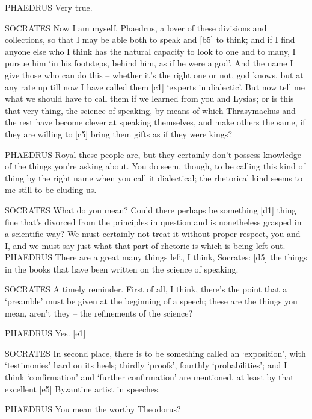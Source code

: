 PHAEDRUS Very true.

SOCRATES Now I am myself, Phaedrus, a lover of these divisions and
collections, so that I may be able both to speak and {[}b5{]} to think;
and if I find anyone else who I think has the natural capacity to look
to one and to many, I
pursue him ‘in his footsteps, behind him, as if he were a
god'. And the name I
give those who can do this -- whether it's the right one or not, god
knows, but at any rate
up till now I have called them {[}c1{]} ‘experts in
dialectic'. But now tell
me what we should have to call them if we learned from you and Lysias;
or is this that very thing, the science of speaking, by means of which
Thrasymachus and the rest have become clever at speaking themselves, and
make others the same, if they are willing to {[}c5{]} bring them gifts
as if they were kings?

PHAEDRUS Royal these people
are, but they certainly
don't possess knowledge of the things you're asking about. You do seem,
though, to be calling this kind of thing by the right name when you call
it dialectical; the rhetorical kind seems to me still to be eluding
us.

SOCRATES What do you mean? Could there perhaps be something {[}d1{]}
thing fine that's divorced from the principles in question and is
nonetheless grasped in a scientific way? We must certainly not treat it
without proper respect, you and I, and we must say just what that part
of rhetoric is which is being left out. PHAEDRUS There are a great many
things left, I think, Socrates: {[}d5{]} the things in the books that
have been written on the science of speaking.

SOCRATES A timely reminder. First of all, I think, there's the point
that a ‘preamble' must be given at the beginning of a speech; these are
the things you mean, aren't they -- the refinements of the science?

PHAEDRUS Yes. {[}e1{]}

SOCRATES In second place, there is to be something called an
‘exposition', with ‘testimonies' hard on its heels; thirdly ‘proofs',
fourthly ‘probabilities'; and I think ‘confirmation' and ‘further
confirmation' are mentioned, at least by that excellent {[}e5{]}
Byzantine artist in speeches.

PHAEDRUS You mean the worthy
Theodorus?

